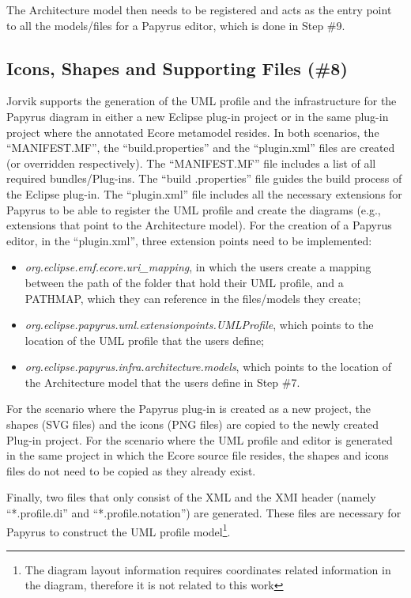 The Architecture model then needs to be registered and acts as the entry point to all the models/files for a Papyrus editor, which is done in Step \#9.

\subsection{Icons, Shapes and Supporting Files (\#8)}
\label{sec:supportingFiles}
Jorvik supports the generation of the UML profile and the infrastructure for the Papyrus diagram in either a new Eclipse plug-in project or in the same plug-in project where the annotated Ecore metamodel resides. 
In both scenarios, the ``MANIFEST.MF'', the ``build.properties'' and the ``plugin.xml'' files are created (or overridden respectively). 
The ``MANIFEST.MF'' file includes a list of all required bundles/Plug-ins.
The ``build .properties'' file guides the build process of the Eclipse plug-in.
The ``plugin.xml'' file includes all the necessary extensions for Papyrus to be able to register the UML profile and create the diagrams (e.g., extensions that point to the Architecture model). 
For the creation of a Papyrus editor, in the ``plugin.xml'', three extension points need to be implemented:
\begin{itemize}
	\item \textit{org.eclipse.emf.ecore.uri\_mapping}, in which the users create a mapping between the path of the folder that hold their UML profile, and a PATHMAP, which they can reference in the files/models they create;
	\item \textit{org.eclipse.papyrus.uml.extensionpoints.UMLProfile}, which points to the location of the UML profile that the users define;
	\item \textit{org.eclipse.papyrus.infra.architecture.models}, which points to the location of the Architecture model that the users define in Step \#7.
\end{itemize}

For the scenario where the Papyrus plug-in is created as a new project, the shapes (SVG files) and the icons (PNG files) are copied to the newly created Plug-in project. 
For the scenario where the UML profile and editor is generated in the same project in which the Ecore source file resides, the shapes and icons files do not need to be copied as they already exist.

Finally, two files that only consist of the XML and the XMI header (namely ``*.profile.di'' and ``*.profile.notation'') are generated. 
These files are necessary for Papyrus to construct the UML profile model\footnote{The diagram layout information requires coordinates related information in the diagram, therefore it is not related to this work}. 

